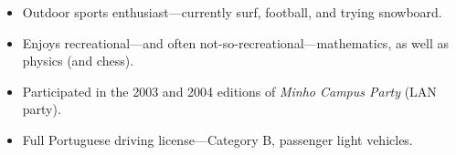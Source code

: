 \documentclass{article}
\newenvironment{topic}[1]
   {{\noindent\large\bfseries\raisebox{0pt}[\height][1ex]{#1}\hrule}%
    \begin{list}{}{%
       \setlength{\leftmargin}{.25cm}}%
    \item[]}
   {\end{list}\medskip}
\begin{document}
\begin{topic}{Additional Information}
\begin{itemize}
\item{Outdoor sports enthusiast---currently surf, football, and trying
snowboard.}
\item{Enjoys recreational---and often not-so-recreational---mathematics,
as well as physics (and chess).}
\item{Participated in the 2003 and 2004 editions of \emph{Minho Campus
Party} (LAN party).}
\item{Full Portuguese driving license---Category B, passenger light
vehicles.}
\end{itemize}
\end{topic}
\end{document}
